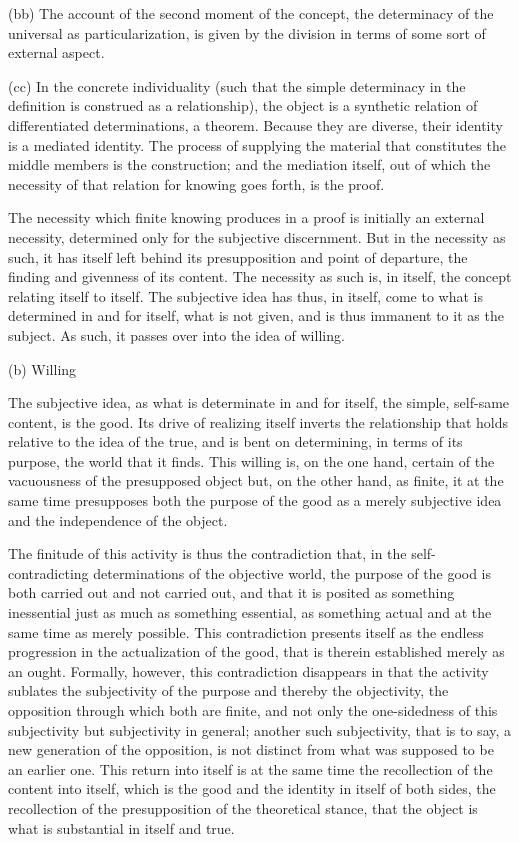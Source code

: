 (bb) The account of the second moment of the concept,
the determinacy of the universal as particularization,
is given by the division in terms of some sort of external aspect.

(cc) In the concrete individuality
(such that the simple determinacy in the definition
is construed as a relationship),
the object is a synthetic relation of
differentiated determinations, a theorem.
Because they are diverse, their identity is a mediated identity.
The process of supplying the material that constitutes
the middle members is the construction;
and the mediation itself,
out of which the necessity of
that relation for knowing goes forth,
is the proof.

The necessity which finite knowing produces in a proof
is initially an external necessity,
determined only for the subjective discernment.
But in the necessity as such, it has itself left behind
its presupposition and point of departure,
the finding and givenness of its content.
The necessity as such is, in itself,
the concept relating itself to itself.
The subjective idea has thus, in itself,
come to what is determined in and for itself,
what is not given, and is thus immanent to it as the subject.
As such, it passes over into the idea of willing.

(b) Willing

The subjective idea, as what is determinate in and for itself,
the simple, self-same content, is the good.
Its drive of realizing itself inverts the relationship
that holds relative to the idea of the true,
and is bent on determining, in terms of its purpose,
the world that it finds.
This willing is, on the one hand,
certain of the vacuousness of the presupposed object
but, on the other hand, as finite,
it at the same time presupposes
both the purpose of the good as a merely subjective idea
and the independence of the object.

The finitude of this activity is thus the contradiction that,
in the self-contradicting determinations of the objective world,
the purpose of the good is both carried out and not carried out,
and that it is posited as something inessential
just as much as something essential,
as something actual and at the same time
as merely possible.
This contradiction presents itself
as the endless progression in the actualization of the good,
that is therein established merely as an ought.
Formally, however, this contradiction disappears
in that the activity sublates the subjectivity of the purpose
and thereby the objectivity,
the opposition through which both are finite,
and not only the one-sidedness of this subjectivity
but subjectivity in general;
another such subjectivity, that is to say,
a new generation of the opposition,
is not distinct from what was supposed to be an earlier one.
This return into itself is at the same time
the recollection of the content into itself,
which is the good and the identity in itself of both sides,
the recollection of the presupposition of the theoretical stance,
that the object is what is substantial in itself and true.

